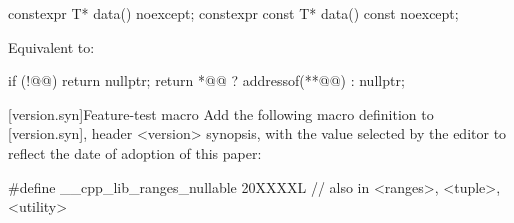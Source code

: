 \begin{itemdecl}
  constexpr T* data() noexcept;
  constexpr const T* data() const noexcept;
\end{itemdecl}

\begin{itemdescr}
\pnum{}
\effects{}
Equivalent to:
\begin{codeblock}
  if (!@@)
    return nullptr;
  return *@@ ? addressof(**@@) : nullptr;
\end{codeblock}
\end{itemdescr}

[version.syn]{Feature-test macro}
Add the following macro definition to [version.syn], header <version> synopsis, with the value selected by the editor to reflect the date of adoption of this paper:

\begin{codeblock}
  #define __cpp_lib_ranges_nullable 20XXXXL // also in <ranges>, <tuple>, <utility>
\end{codeblock}
